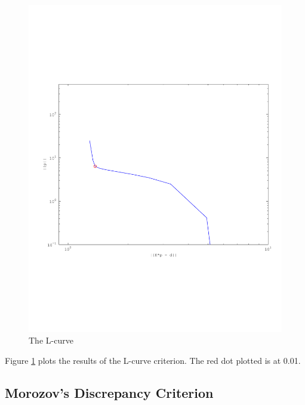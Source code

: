 \documentclass{article}
\begin{document}
\begin{figure}[!htb]
  \includegraphics[scale=.5]{plots/L-curve.pdf}
  \caption{The L-curve} 
 \label{fig:lcurve}
\end{figure}

Figure \ref{fig:lcurve} plots the results of the L-curve criterion. The
red dot plotted is at 0.01. 


\subsection{Morozov's Discrepancy Criterion}
\end{document}
